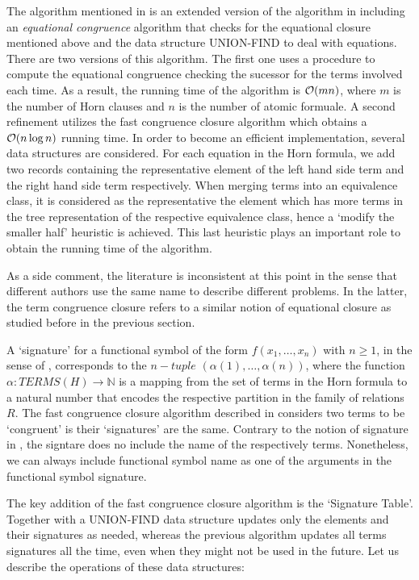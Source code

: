 The algorithm mentioned in \cite{GALLIER1987233} is an extended version of the algorithm in
\cite{DOWLING1984267} including an \textit{equational congruence} algorithm that checks for
the equational closure mentioned above and the data structure UNION-FIND to deal with equations.
There are two versions of this algorithm. The first one uses a procedure to compute the equational
congruence checking the sucessor for the terms involved each time. As a result, the running time
of the algorithm is $\mathcal{O}(m n)$, where $m$ is the number of Horn clauses and $n$ is the number
of atomic formuale. A second refinement utilizes the fast congruence closure algorithm
\cite{Downey:1980:VCS:322217.322228} which obtains a $\mathcal{O}(n \log n)$ running time. In order
to become an efficient implementation, several data structures are considered. For each equation
in the Horn formula, we add two records containing the representative element of the left hand side
term and the right hand side term respectively. When merging terms into an equivalence class, it
is considered as the representative the element which has more terms in the tree representation
of the respective equivalence class, hence a `modify the smaller half' heuristic is achieved. This
last heuristic plays an important role to obtain the running time of the algorithm. 

As a side comment, the literature is inconsistent at this point in the sense
that different authors use the same name to describe different problems. In the latter, the term
congruence closure refers to a similar notion of equational closure as studied before in the
previous section.

A `signature' for a functional symbol of the form $f(x_1, \dots, x_n)$ with $n \geq 1$, 
in the sense of \cite{Downey:1980:VCS:322217.322228}, corresponds to the $n-tuple$
$(\alpha(1), \dots, \alpha(n))$, where the function $\alpha : TERMS(H) \rightarrow \mathbb{N}$
is a mapping from the set of terms in the Horn formula to a natural number that encodes
the respective partition in the family of relations $R$. 
The fast congruence closure algorithm described in 
\cite{Downey:1980:VCS:322217.322228} considers two terms to be
`congruent' is their `signatures' are the same. Contrary to the notion of signature in
\cite{GALLIER1987233}, the signtare does no include the name of the respectively terms.
Nonetheless, we can always include functional symbol name as one of the arguments
in the functional symbol signature.

The key addition of the fast congruence closure algorithm is the `Signature Table'. Together
with a UNION-FIND data structure updates only the elements and their signatures as needed,
whereas the previous algorithm updates all terms signatures all the time, even when
they might not be used in the future. Let us describe the operations of these data structures:

